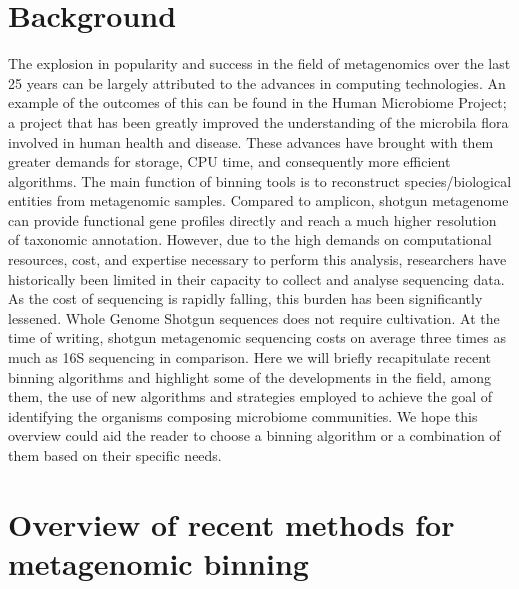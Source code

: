 \documentclass{article}
\begin{document}
\section{Background}
The explosion in popularity and success in the field of metagenomics over the last 25 years can be largely attributed to the advances in computing technologies.
An example of the outcomes of this can be found in the Human Microbiome Project; a project that has been greatly improved the understanding of the microbila flora involved in human health and disease.
These advances have brought with them greater demands for storage, CPU time, and consequently more efficient algorithms.
The main function of binning tools is to reconstruct species/biological entities from metagenomic samples.  
Compared to amplicon, shotgun metagenome can provide functional gene profiles directly and reach a much higher resolution of taxonomic annotation.
However, due to the high demands on computational resources, cost, and expertise necessary to perform this analysis, researchers have historically been limited in their capacity to collect and analyse sequencing data.
As the cost of sequencing is rapidly falling, this burden has been significantly lessened.
Whole Genome Shotgun sequences does not require cultivation.
At the time of writing, shotgun metagenomic sequencing costs on average three times as much as 16S sequencing in comparison.
Here we will briefly recapitulate recent binning algorithms and highlight some of the developments in the field, among them, the use of new algorithms and strategies employed to achieve the goal of identifying the organisms composing microbiome communities.
We hope this overview could aid the reader to choose a binning algorithm or a combination of them based on their specific needs.

\section{Overview of recent methods for metagenomic binning}
\end{document}
